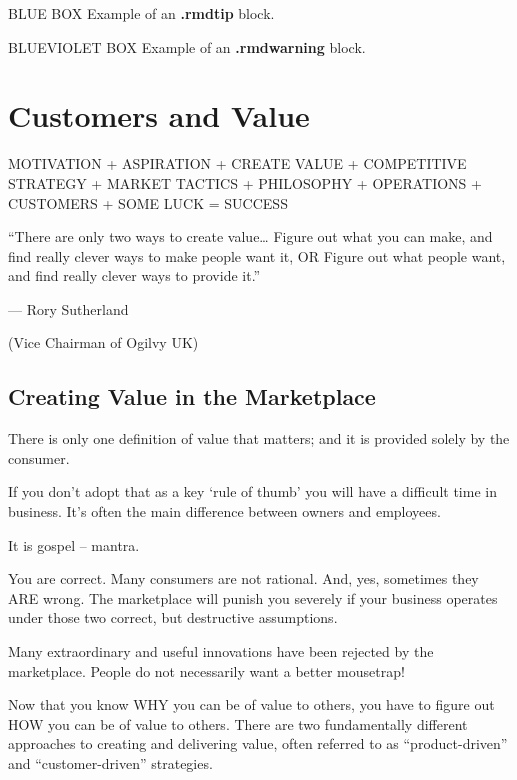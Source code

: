 \documentclass[
]{book}
\begin{document}
BLUE BOX Example of an \textbf{.rmdtip} block.

BLUEVIOLET BOX Example of an \textbf{.rmdwarning} block.

\hypertarget{customers-and-value}{%
\chapter{\texorpdfstring{\textbf{Customers and Value}}{Customers and Value}}\label{customers-and-value}}

{MOTIVATION}
{+}
{ASPIRATION}
{+}
{CREATE VALUE}
{+}
{COMPETITIVE STRATEGY }
{+}
{MARKET TACTICS}
{+}
{PHILOSOPHY}
{+}
{OPERATIONS}
{+}
{CUSTOMERS}
{+}
{SOME LUCK}
{=}
{SUCCESS}

``There are only two ways to create value\ldots{}
Figure out what you can make, and find really clever ways to make people want it,
{OR}
{Figure out what people want, and find really clever ways to provide it.''}

--- Rory Sutherland

(Vice Chairman of Ogilvy UK)

\hypertarget{creating-value-in-the-marketplace}{%
\section{\texorpdfstring{\textbf{Creating Value in the Marketplace}}{Creating Value in the Marketplace}}\label{creating-value-in-the-marketplace}}

There is only one definition of value that matters; and it is provided solely by the consumer.

If you don't adopt that as a key `rule of thumb' you will have a difficult time in business. It's often the main difference between owners and employees.

It is gospel -- mantra.

You are correct. Many consumers are not rational. And, yes, sometimes they ARE wrong. The marketplace will punish you severely if your business operates under those two correct, but destructive assumptions.

Many extraordinary and useful innovations have been rejected by the marketplace. People do not necessarily want a better mousetrap!

Now that you know WHY you can be of value to others, you have to figure out HOW you can be of value to others. There are two fundamentally different approaches to creating and delivering value, often referred to as ``product-driven'' and ``customer-driven'' strategies.
\end{document}
